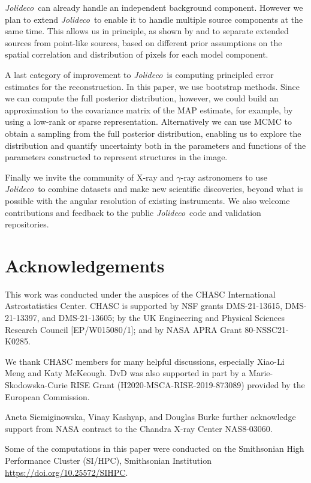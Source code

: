 \documentclass[twocolumn, linenumbers]{aastex631}
\newcommand{\jolideco}{\textit{Jolideco}~}
\newcommand{\gammaray}{$\gamma$-ray\xspace}
\begin{document}
    \jolideco can already handle an independent background component. However we plan to extend \jolideco to enable it to handle multiple source components at the same time. This allows us in principle, as shown by \cite{Selig2015} and \citet{Pumpe2018} to separate extended sources from point-like sources, based on different prior assumptions on the spatial correlation and distribution of pixels for each model component. 

    A last category of improvement to \jolideco is computing principled error estimates for the reconstruction. In this paper, we use bootstrap methods. Since we can compute the full posterior distribution, however, we could build an approximation to the covariance matrix of the MAP estimate, for example, by using a low-rank or sparse representation.
    Alternatively we can use MCMC to obtain a sampling from the full posterior distribution, enabling us to explore the distribution and quantify  uncertainty both in the parameters and functions of the parameters constructed to represent structures in the image. 
    
    Finally we invite the community of X-ray and \gammaray astronomers to use  \jolideco to combine datasets and make new scientific discoveries, beyond what is possible with the angular resolution of existing instruments. We also welcome contributions and feedback to the public \jolideco code and validation repositories. 

    \section*{Acknowledgements}
    This work was conducted under the auspices of the CHASC International Astrostatistics Center.
    CHASC is supported by NSF grants DMS-21-13615, DMS-21-13397, and DMS-21-13605; by the UK Engineering
    and Physical Sciences Research Council [EP/W015080/1]; and by NASA APRA Grant 80-NSSC21-K0285.
    
    We thank CHASC members for many helpful discussions, especially Xiao-Li Meng and Katy McKeough.
    DvD was also supported in part by a Marie-Skodowska-Curie RISE Grant (H2020-MSCA-RISE-2019-873089)
    provided by the European Commission.
    
    Aneta Siemiginowska, Vinay Kashyap, and Douglas Burke further acknowledge support from NASA
    contract to the Chandra X-ray Center NAS8-03060.

    Some of the computations in this paper were conducted on the Smithsonian High Performance
    Cluster (SI/HPC), Smithsonian Institution \url{https://doi.org/10.25572/SIHPC}.
\end{document}
